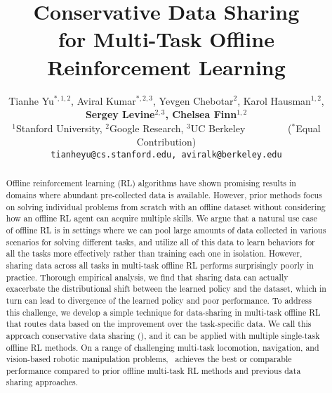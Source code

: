 \documentclass{article}
\title{Conservative Data Sharing \\ for Multi-Task Offline Reinforcement Learning}
\author{Tianhe Yu$^{*, 1, 2}$, Aviral Kumar$^{*, 2, 3}$, Yevgen Chebotar$^{2}$, Karol Hausman$^{1,2}$, \vspace{0.05cm}\\ \textbf{Sergey Levine$^{2,3}$, Chelsea Finn$^{1,2}$} \vspace{0.1cm}\\
$^1$Stanford University, $^2$Google Research, $^3$UC Berkeley~~~~~~~~ ($^*$Equal Contribution) \vspace{0.1cm}\\ 
\texttt{tianheyu@cs.stanford.edu, aviralk@berkeley.edu}
}
\newcommand{\arxiv}[1] {{\color{black} #1}}
\begin{document}
\maketitle


\begin{abstract}
Offline reinforcement learning (RL) algorithms have shown promising results in domains where abundant pre-collected data is available. However, prior methods focus on solving individual problems from scratch with an offline dataset without considering how an offline RL agent can acquire multiple skills. \arxiv{We argue that a natural use case of offline RL is in settings where we can pool large amounts of data collected in various scenarios for solving different tasks, and utilize all of this data to learn behaviors for all the tasks more effectively rather than training each one in isolation. However, sharing data across all tasks in multi-task offline RL performs surprisingly poorly in practice.
Thorough empirical analysis, we find that sharing data can actually exacerbate the distributional shift between the learned policy and the dataset, which in turn can lead to divergence of the learned policy and poor performance.}
To address this challenge, we develop a simple technique for data-sharing in multi-task offline RL that routes data based on the improvement over the task-specific data. We call this approach conservative data sharing (\methodname), and it can be applied with multiple single-task offline RL methods.
On a range of challenging multi-task locomotion, navigation, and vision-based robotic manipulation problems, \methodname\ achieves the best or comparable performance compared to prior offline multi-task RL methods and previous data sharing approaches.  
\end{abstract}
\end{document}

